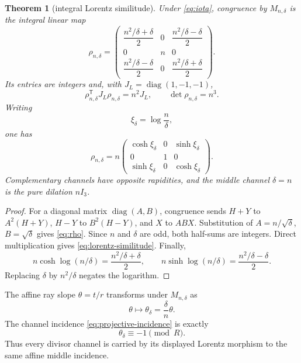 \documentclass[11pt]{article}
\newtheorem{theorem}{Theorem}[section]
\theoremstyle{definition}
\theoremstyle{remark}
\newcommand{\diag}{\operatorname{diag}}
\newcommand{\1}{\mathbf 1}
\begin{document}
\begin{theorem}[integral Lorentz similitude]\label{thm:lorentz}
Under \eqref{eq:iota}, congruence by $M_{n,\delta}$ is the integral linear map
\begin{equation}\label{eq:rho}
 \rho_{n,\delta}=
 \begin{pmatrix}
 \dfrac{n^2/\delta+\delta}{2}&0&
 \dfrac{n^2/\delta-\delta}{2}\\[1ex]
 0&n&0\\[1ex]
 \dfrac{n^2/\delta-\delta}{2}&0&
 \dfrac{n^2/\delta+\delta}{2}
 \end{pmatrix}.
\end{equation}
Its entries are integers and, with $J_L=\diag(1,-1,-1)$,
\begin{equation}\label{eq:lorentz-similitude}
 \rho_{n,\delta}^{\mathsf T}J_L\rho_{n,\delta}=n^2J_L,
 \qquad
 \det\rho_{n,\delta}=n^3.
\end{equation}
Writing
\begin{equation}\label{eq:rapidity}
 \xi_\delta=\log\frac n\delta,
\end{equation}
one has
\begin{equation}\label{eq:boost}
 \rho_{n,\delta}=n
 \begin{pmatrix}
 \cosh\xi_\delta&0&\sinh\xi_\delta\\
 0&1&0\\
 \sinh\xi_\delta&0&\cosh\xi_\delta
 \end{pmatrix}.
\end{equation}
Complementary channels have opposite rapidities, and the middle channel
$\delta=n$ is the pure dilation $nI_3$.
\end{theorem}

\begin{proof}
For a diagonal matrix $\diag(A,B)$, congruence sends
$H+Y$ to $A^2(H+Y)$, $H-Y$ to $B^2(H-Y)$, and $X$ to $ABX$.
Substitution of $A=n/\sqrt\delta$, $B=\sqrt\delta$ gives
\eqref{eq:rho}.  Since $n$ and $\delta$ are odd, both half-sums are integers.
Direct multiplication gives \eqref{eq:lorentz-similitude}.  Finally,
\[
 n\cosh\log(n/\delta)=\frac{n^2/\delta+\delta}{2},\qquad
 n\sinh\log(n/\delta)=\frac{n^2/\delta-\delta}{2}.
\]
Replacing $\delta$ by $n^2/\delta$ negates the logarithm.
\end{proof}

The affine ray slope $\theta=t/r$ transforms under $M_{n,\delta}$ as
\begin{equation}\label{eq:slope-transform}
 \theta\longmapsto\theta_\delta=\frac\delta n\theta.
\end{equation}
The channel incidence \eqref{eq:projective-incidence} is exactly
\begin{equation}\label{eq:universal-middle-incidence}
 \boxed{\theta_\delta\equiv-1\pmod R.}
\end{equation}
Thus every divisor channel is carried by its displayed Lorentz morphism to
the same affine middle incidence.
\end{document}
